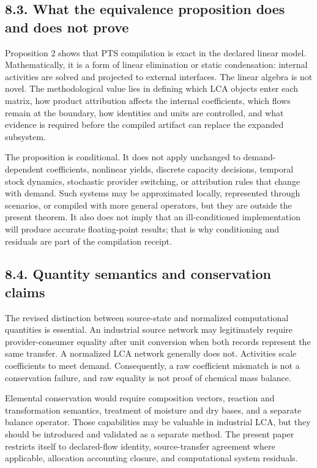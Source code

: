 \documentclass[
  10pt,
  a4paper,
  DIV=11,
  numbers=noendperiod]{scrartcl}
\begin{document}
\subsection{8.3. What the equivalence proposition does and does not
prove}\label{what-the-equivalence-proposition-does-and-does-not-prove}

Proposition 2 shows that PTS compilation is exact in the declared linear
model. Mathematically, it is a form of linear elimination or static
condensation: internal activities are solved and projected to external
interfaces. The linear algebra is not novel. The methodological value
lies in defining which LCA objects enter each matrix, how product
attribution affects the internal coefficients, which flows remain at the
boundary, how identities and units are controlled, and what evidence is
required before the compiled artifact can replace the expanded
subsystem.

The proposition is conditional. It does not apply unchanged to
demand-dependent coefficients, nonlinear yields, discrete capacity
decisions, temporal stock dynamics, stochastic provider switching, or
attribution rules that change with demand. Such systems may be
approximated locally, represented through scenarios, or compiled with
more general operators, but they are outside the present theorem. It
also does not imply that an ill-conditioned implementation will produce
accurate floating-point results; that is why conditioning and residuals
are part of the compilation receipt.

\subsection{8.4. Quantity semantics and conservation
claims}\label{quantity-semantics-and-conservation-claims}

The revised distinction between source-state and normalized
computational quantities is essential. An industrial source network may
legitimately require provider-consumer equality after unit conversion
when both records represent the same transfer. A normalized LCA network
generally does not. Activities scale coefficients to meet demand.
Consequently, a raw coefficient mismatch is not a conservation failure,
and raw equality is not proof of chemical mass balance.

Elemental conservation would require composition vectors, reaction and
transformation semantics, treatment of moisture and dry bases, and a
separate balance operator. Those capabilities may be valuable in
industrial LCA, but they should be introduced and validated as a
separate method. The present paper restricts itself to declared-flow
identity, source-transfer agreement where applicable, allocation
accounting closure, and computational system residuals.
\end{document}
